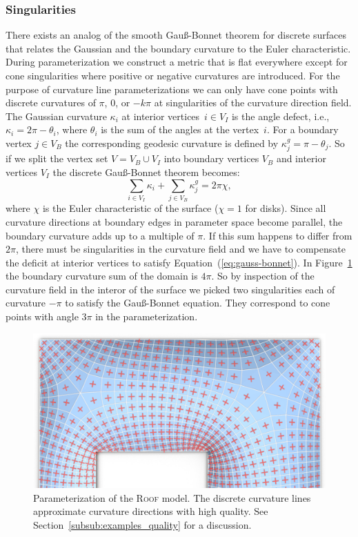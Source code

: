 \documentclass[Thesis.tex]{subfiles}
\begin{document}
\subsubsection{Singularities}
\label{subsub:singularities}
There exists an analog of the smooth Gau{\ss}-Bonnet theorem
for discrete surfaces that relates the Gaussian and the boundary curvature to
the Euler characteristic. During parameterization we construct a metric that is
flat everywhere except for cone singularities where positive or negative
curvatures are introduced. For the purpose of curvature line parameterizations
we can only have cone points with discrete curvatures of $\pi$, $0$, or $-k\pi$
at singularities of the curvature direction field. The Gaussian curvature
$\kappa_i$ at interior vertices~$i\in V_I$ is the angle defect, i.e., $\kappa_i =
2\pi-\theta_i$, where $\theta_i$ is the sum of the angles at the vertex~$i$.
For a boundary vertex $j\in V_B$ the corresponding geodesic curvature is defined by
$\kappa^g_j = \pi-\theta_j$. So if we split the vertex set $V = V_B \cup V_I$ into
boundary vertices $V_B$ and interior vertices $V_I$ the discrete
Gau{\ss}-Bonnet theorem becomes:
\begin{equation}
  \label{eq:gauss-bonnet} \sum_{i\in {V_I}}\kappa_i + \sum_{j\in
  V_B}\kappa^g_j = 2\pi \chi,
\end{equation} 
where $\chi$ is the Euler characteristic of the surface ($\chi = 1$ for disks).
Since all curvature directions at boundary edges in parameter space become parallel, the
boundary curvature adds up to a multiple of $\pi$. If this sum happens to
differ from $2\pi$, there must be singularities in the curvature field and we
have to compensate the deficit at interior vertices to satisfy
Equation~(\ref{eq:gauss-bonnet}). In Figure~\ref{fig:dach01_directions} the
boundary curvature sum of the domain is $4\pi$. So by inspection of the curvature field in the 
interor of the surface we picked two singularities each of curvature $-\pi$ to satisfy the 
Gau{\ss}-Bonnet equation. They correspond to cone points with angle $3\pi$ in the 
parameterization.

\begin{figure}[t]
\centering
\includegraphics[width=\linewidth]{image/aag2012/dach_example01_directions.pdf}
\caption{Parameterization of the \textsc{Roof} model. The discrete 
curvature lines approximate curvature directions with high quality. See 
Section~\ref{subsub:examples_quality} for a discussion.}
\label{fig:dach01_directions}
\end{figure}
\end{document}
